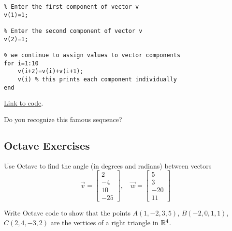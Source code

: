 \documentclass{ximera}
\begin{document}
\begin{example}\label{ex:loop2}
    \begin{verbatim}
% Enter the first component of vector v
v(1)=1;

% Enter the second component of vector v
v(2)=1;

% we continue to assign values to vector components
for i=1:10
    v(i+2)=v(i)+v(i+1);
    v(i) % this prints each component individually
end
    \end{verbatim}

\href{https://sagecell.sagemath.org/?z=eJx1jjEKwzAMRXeD76AlEJOl7tiQsQcxttwIUjnYiktvXwdKmqVapC_pfX4HdxbMIDNCpFwEfHquiZEFUoSKXlKGqlXtrZnsqJVW3Ykp6BOH_9D1B72wvbEQbwiSwJVCD4bqlg3Lvvhih1XRKjZNk73Zi1bQqvY0NMfWzLDP1ozHwUDXElGBNVODAZ2fT7mIA1UKm1uWt1bI4QOvKk6t&lang=octave&interacts=eJyLjgUAARUAuQ==}{Link to code}.   

Do you recognize this famous sequence?
\end{example}

\subsection*{Octave Exercises}

\begin{problem}\label{prob_oct_vec_2}
    Use Octave to find the angle (in degrees and radians) between vectors 
    $$\vec{v}=\begin{bmatrix}2\\-4\\10\\-25\end{bmatrix},\quad\vec{w}=\begin{bmatrix}5\\3\\-20\\11\end{bmatrix}$$
\end{problem}

\begin{problem}\label{prob_oct_vec_3}
Write Octave code to show that the points $A(1, -2, 3, 5)$, $B(-2, 0, 1, 1)$, $C(2, 4, -3, 2)$ are the vertices of a right triangle in $\mathbb{R}^4$.
\end{problem}
\end{document}
